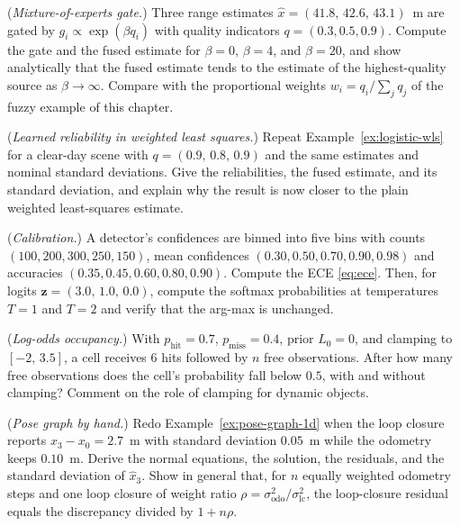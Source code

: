 \problemsection
\begin{prob}\label{prob:ch04:1}
(\emph{Mixture-of-experts gate.}) Three range estimates $\widehat{x}=(41.8,\,42.6,\,43.1)$~m are gated by $g_i\propto\exp(\beta q_i)$ with quality indicators $q=(0.3,0.5,0.9)$. Compute the gate and the fused estimate for $\beta=0$, $\beta=4$, and $\beta=20$, and show analytically that the fused estimate tends to the estimate of the highest-quality source as $\beta\to\infty$. Compare with the proportional weights $w_i=q_i/\sum_j q_j$ of the fuzzy example of this chapter.
\end{prob}
\begin{prob}\label{prob:ch04:2}
(\emph{Learned reliability in weighted least squares.}) Repeat Example~\ref{ex:logistic-wls} for a clear-day scene with $q=(0.9,\,0.8,\,0.9)$ and the same estimates and nominal standard deviations. Give the reliabilities, the fused estimate, and its standard deviation, and explain why the result is now closer to the plain weighted least-squares estimate.
\end{prob}
\begin{prob}\label{prob:ch04:3}
(\emph{Calibration.}) A detector's confidences are binned into five bins with counts $(100,200,300,250,150)$, mean confidences $(0.30,0.50,0.70,0.90,0.98)$ and accuracies $(0.35,0.45,0.60,0.80,0.90)$. Compute the ECE \eqref{eq:ece}. Then, for logits $\mathbf{z}=(3.0,\,1.0,\,0.0)$, compute the softmax probabilities at temperatures $T=1$ and $T=2$ and verify that the arg-max is unchanged.
\end{prob}
\begin{prob}\label{prob:ch04:4}
(\emph{Log-odds occupancy.}) With $p_{\mathrm{hit}}=0.7$, $p_{\mathrm{miss}}=0.4$, prior $L_0=0$, and clamping to $[-2,\,3.5]$, a cell receives $6$ hits followed by $n$ free observations. After how many free observations does the cell's probability fall below $0.5$, with and without clamping? Comment on the role of clamping for dynamic objects.
\end{prob}
\begin{prob}\label{prob:ch04:5}
(\emph{Pose graph by hand.}) Redo Example~\ref{ex:pose-graph-1d} when the loop closure reports $x_3-x_0=2.7$~m with standard deviation $0.05$~m while the odometry keeps $0.10$~m. Derive the normal equations, the solution, the residuals, and the standard deviation of $\widehat{x}_3$. Show in general that, for $n$ equally weighted odometry steps and one loop closure of weight ratio $\rho=\sigma_{\mathrm{odo}}^{2}/\sigma_{\mathrm{lc}}^{2}$, the loop-closure residual equals the discrepancy divided by $1+n\rho$.
\end{prob}
